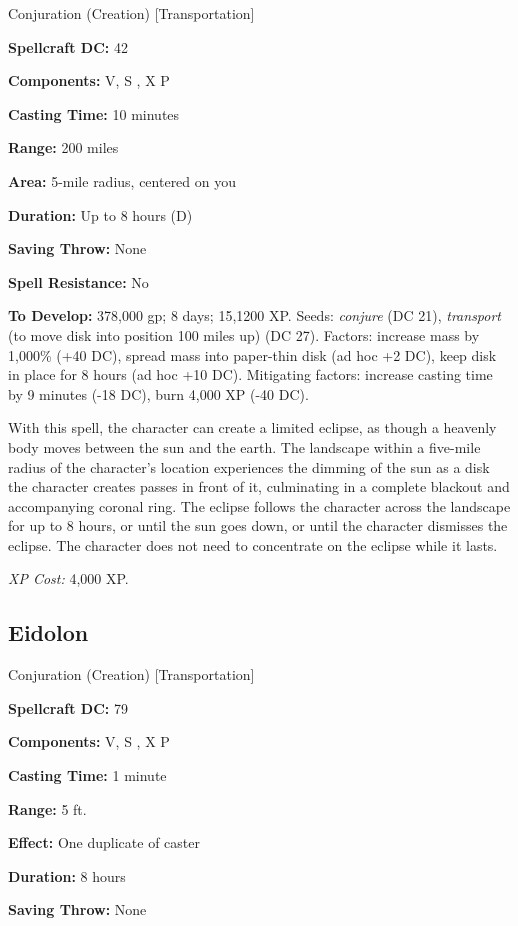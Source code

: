 \documentclass{article}
\begin{document}
Conjuration (Creation) [Transportation]

\textbf{Spellcraft DC:} 42 

\textbf{Components:} V, S , X P 

\textbf{Casting Time:} 10 minutes 

\textbf{Range:} 200 miles 

\textbf{Area:} 5-mile radius, centered on you 

\textbf{Duration:} Up to 8 hours (D) 

\textbf{Saving Throw:} None 

\textbf{Spell Resistance:} No 

\textbf{To Develop:} 378,000 gp; 8 days; 15,1200 XP. Seeds: \textit{conjure }(DC 
21), \textit{transport }(to move disk into position 100 miles up) (DC 27). Factors: 
increase mass by 1,000\% (+40 DC), spread mass into paper-thin disk (ad hoc +2 
DC), keep disk in place for 8 hours (ad hoc +10 DC). Mitigating factors: increase 
casting time by 9 minutes (-18 DC), burn 4,000 XP (-40 DC). 

With this spell, the character can create a limited eclipse, as though a heavenly 
body moves between the sun and the earth. The landscape within a five-mile radius 
of the character's location experiences the dimming of the sun as a disk the character 
creates passes in front of it, culminating in a complete blackout and accompanying 
coronal ring. The eclipse follows the character across the landscape for up to 
8 hours, or until the sun goes down, or until the character dismisses the eclipse. 
The character does not need to concentrate on the eclipse while it lasts. 

\textit{XP Cost: }4,000 XP. 

\vspace{12pt}
\subsection*{Eidolon }

Conjuration (Creation) [Transportation]

\textbf{Spellcraft DC:} 79 

\textbf{Components:} V, S , X P 

\textbf{Casting Time:} 1 minute 

\textbf{Range:} 5 ft. 

\textbf{Effect:} One duplicate of caster 

\textbf{Duration:} 8 hours 

\textbf{Saving Throw:} None 
\end{document}
